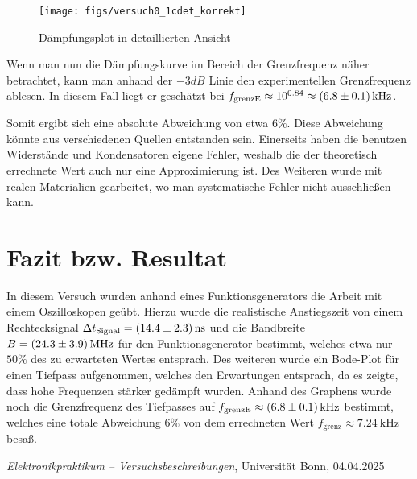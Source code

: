 \documentclass{article}
\begin{document}
\begin{enumerate}[label=\alph*]
         
         \begin{figure}[H]
             \centering
             \texttt{[image: figs/versuch0\_1cdet\_korrekt]}
             \caption{Dämpfungsplot in detaillierten Ansicht}
             \label{0_1_(c)_Dämpfung_detail}
         \end{figure}
         
         Wenn man nun die Dämpfungskurve im Bereich der Grenzfrequenz näher betrachtet, kann man anhand der $-3dB$ Linie den experimentellen Grenzfrequenz ablesen. In diesem Fall liegt er geschätzt bei $f_{\text{grenzE}} \approx  10^{0.84} \approx\SI{6.8 \pm 0.1}{\kilo\hertz}$. 
         
        Somit ergibt sich eine absolute Abweichung von etwa $6 \% $. Diese Abweichung könnte aus verschiedenen Quellen entstanden sein. Einerseits haben die benutzen Widerstände und Kondensatoren eigene Fehler, weshalb die der theoretisch errechnete Wert auch nur eine Approximierung ist. Des Weiteren wurde mit realen Materialien gearbeitet, wo man systematische Fehler nicht ausschließen kann.
         
        \end{enumerate}

        \section{Fazit bzw. Resultat}
        
        
        In diesem Versuch wurden anhand eines Funktionsgenerators die Arbeit mit einem Oszilloskopen geübt. 
        Hierzu wurde die realistische Anstiegszeit von einem Rechtecksignal 
        $\Delta t_\text{Signal} = \SI{14.4 \pm 2.3}{\nano\second}$
         und die Bandbreite $B = \SI{24.3 \pm 3.9}{\mega\hertz}$ für den Funktionsgenerator bestimmt, welches etwa nur $50\%$ des zu erwarteten Wertes entsprach.
         Des weiteren wurde ein Bode-Plot für einen Tiefpass aufgenommen, welches den Erwartungen entsprach, da es 
         zeigte, dass hohe Frequenzen stärker gedämpft wurden. Anhand des Graphens wurde noch die Grenzfrequenz des 
         Tiefpasses auf $f_{\text{grenzE}} \approx \SI{6.8 \pm 0.1}{\kilo\hertz}$ bestimmt, welches eine totale Abweichung
           $6 \% $ von dem errechneten Wert $ f_{\text{grenz}}
         \approx \SI{7.24}{\kilo\hertz}$ besaß.


        \begin{thebibliography}{9}

        \textit{Elektronikpraktikum -- Versuchsbeschreibungen}, Universität Bonn, 04.04.2025


\end{thebibliography}
\end{document}
